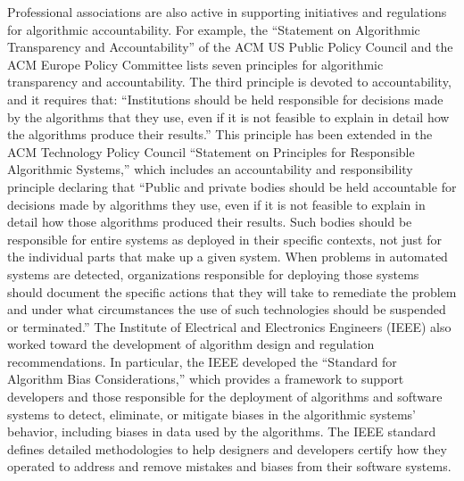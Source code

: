Professional associations are also active in supporting initiatives and regulations for algorithmic accountability. For example, the ``Statement on Algorithmic Transparency and Accountability'' of the ACM US Public Policy Council and the ACM Europe Policy Committee lists seven principles for algorithmic transparency and accountability. The third principle is devoted to accountability, and it requires that: ``Institutions should be held responsible for decisions made by the algorithms that they use, even if it is not feasible to explain in detail how the algorithms produce their results.'' This principle has been extended in the ACM Technology Policy Council ``Statement on Principles for Responsible Algorithmic Systems,'' which includes an accountability and responsibility principle declaring that ``Public and private bodies should be held accountable for decisions made by algorithms they use, even if it is not feasible to explain in detail how those algorithms produced their results. Such bodies should be responsible for entire systems as deployed in their specific contexts, not just for the individual parts that make up a given system. When problems in automated systems are detected, organizations responsible for deploying those systems should document the specific actions that they will take to remediate the problem and under what circumstances the use of such technologies should be suspended or terminated.'' The Institute of Electrical and Electronics Engineers (IEEE) also worked toward the development of algorithm design and regulation recommendations. In particular, the IEEE developed the ``Standard for Algorithm Bias Considerations,'' which provides a framework to support developers and those responsible for the deployment of algorithms and software systems to detect, eliminate, or mitigate biases in the algorithmic systems' behavior, including biases in data used by the algorithms. The IEEE standard defines detailed methodologies to help designers and developers certify how they operated to address and remove mistakes and biases from their software systems.

